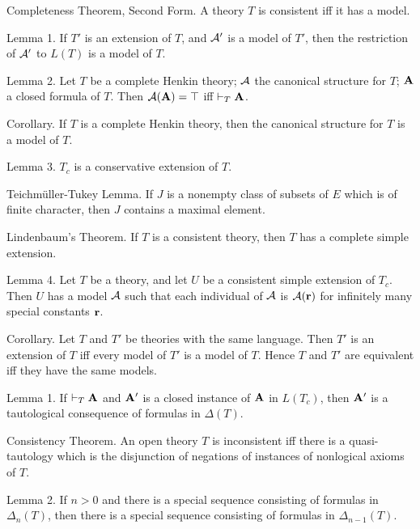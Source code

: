 \proclaim Completeness Theorem, Second Form. A theory $T$ is consistent iff it has a model.

\proclaim Lemma 1. If $T'$ is an extension of $T$, and ${\cal A}'$ is a model of $T'$,
then the restriction of ${\cal A}'$ to $L(T)$ is a model of $T$.

\proclaim Lemma 2. Let $T$ be a complete Henkin theory; ${\cal A}$ the canonical
structure for $T$; ${\bf A}$ a closed formula of $T$. Then ${\cal A}({\bf A}) = \top$ iff
$\vdash_T {\bf A}$.

\proclaim Corollary. If $T$ is a complete Henkin theory, then the canonical
structure for $T$ is a model of $T$.

\proclaim Lemma 3. $T_c$ is a conservative extension of $T$.

\proclaim Teichm\"uller-Tukey Lemma. If $J$ is a nonempty class of subsets of $E$ which is
of finite character, then $J$ contains a maximal element.

\proclaim Lindenbaum's Theorem. If $T$ is a consistent theory, then $T$ has a complete
simple extension.

\proclaim Lemma 4. Let $T$ be a theory, and let $U$ be a consistent simple extension of
$T_c$. Then $U$ has a model ${\cal A}$ such that each individual of ${\cal A}$ is ${\cal A}({\bf r})$ for
infinitely many special constants ${\bf r}$.

\proclaim Corollary. Let $T$ and $T'$ be theories with the same language. Then $T'$ is an
extension of $T$ iff every model of $T'$ is a model of $T$. Hence $T$ and $T'$ are
equivalent iff they have the same models.


\proclaim Lemma 1. If $\vdash_T {\bf A}$ and ${\bf A}'$ is a closed instance of ${\bf A}$ in $L(T_c)$,
then ${\bf A}'$ is a tautological consequence of formulas in $\Delta(T)$.

\proclaim Consistency Theorem. An open theory $T$ is inconsistent iff there is a
quasi-tautology which is the disjunction of negations of instances of nonlogical
axioms of $T$.

\proclaim Lemma 2. If $n > 0$ and there is a special sequence consisting of formulas in
$\Delta_n(T)$, then there is a special sequence consisting of formulas in $\Delta_{n-1}(T)$.

